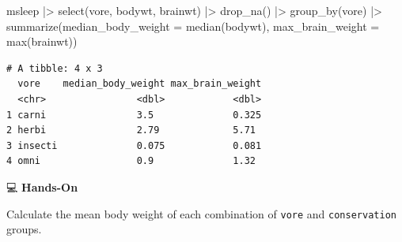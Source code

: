 \documentclass[
  letterpaper,
  DIV=11,
  numbers=noendperiod]{scrreprt}
\newenvironment{Shaded}{\begin{snugshade}}{\end{snugshade}}
\newcommand{\AttributeTok}[1]{\textcolor[rgb]{0.40,0.45,0.13}{#1}}
\newcommand{\FunctionTok}[1]{\textcolor[rgb]{0.28,0.35,0.67}{#1}}
\newcommand{\NormalTok}[1]{\textcolor[rgb]{0.00,0.23,0.31}{#1}}
\newcommand{\SpecialCharTok}[1]{\textcolor[rgb]{0.37,0.37,0.37}{#1}}
\begin{document}
\begin{tcolorbox}[enhanced jigsaw, colbacktitle=quarto-callout-tip-color!10!white, opacitybacktitle=0.6, breakable, left=2mm, leftrule=.75mm, toprule=.15mm, toptitle=1mm, bottomtitle=1mm, colframe=quarto-callout-tip-color-frame, opacityback=0, coltitle=black, arc=.35mm, titlerule=0mm, colback=white, bottomrule=.15mm, title=\textcolor{quarto-callout-tip-color}{\faLightbulb}\hspace{0.5em}{Answer}, rightrule=.15mm]

\begin{Shaded}
\begin{Highlighting}[]
\NormalTok{msleep }\SpecialCharTok{|\textgreater{}}
  \FunctionTok{select}\NormalTok{(vore, bodywt, brainwt) }\SpecialCharTok{|\textgreater{}}
  \FunctionTok{drop\_na}\NormalTok{() }\SpecialCharTok{|\textgreater{}}
  \FunctionTok{group\_by}\NormalTok{(vore) }\SpecialCharTok{|\textgreater{}}
  \FunctionTok{summarize}\NormalTok{(}\AttributeTok{median\_body\_weight =} \FunctionTok{median}\NormalTok{(bodywt),}
            \AttributeTok{max\_brain\_weight =} \FunctionTok{max}\NormalTok{(brainwt))}
\end{Highlighting}
\end{Shaded}

\begin{verbatim}
# A tibble: 4 x 3
  vore    median_body_weight max_brain_weight
  <chr>                <dbl>            <dbl>
1 carni                3.5              0.325
2 herbi                2.79             5.71 
3 insecti              0.075            0.081
4 omni                 0.9              1.32 
\end{verbatim}

\end{tcolorbox}

💻 \textbf{Hands-On}

Calculate the mean body weight of each combination of \texttt{vore} and
\texttt{conservation} groups.
\end{document}
